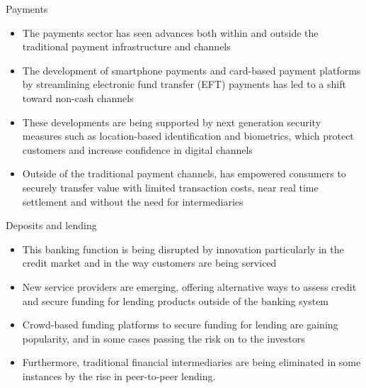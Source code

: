 \documentclass[10pt]{beamer}
\begin{document}
\begin{frame}{Payments}
	\begin{itemize}
		\item The payments sector has seen advances both within and outside the traditional payment infrastructure and channels
		\item The development of smartphone payments and card-based payment platforms by streamlining electronic fund transfer (EFT) payments has led to a shift toward non-cash channels
		\item These developments are being supported by next generation security measures such as location-based identification and biometrics, which protect customers and increase confidence in digital channels
		\item Outside of the traditional payment channels, has empowered consumers to securely transfer value with limited transaction costs, near real time settlement and without the need for intermediaries
	\end{itemize}
\end{frame}


\begin{frame}{Deposits and lending}
	\begin{itemize}
		\item This banking function is being disrupted by innovation particularly in the credit market and in the way customers are being serviced
		\item New service providers are emerging, offering alternative ways to assess credit and secure funding for lending products outside of the banking system
		\item Crowd-based funding platforms to secure funding for lending are gaining popularity, and in some cases passing the risk on to the investors
		\item Furthermore, traditional financial intermediaries are being eliminated in some instances by the rise in peer-to-peer lending.
	\end{itemize}
\end{frame}

\end{document}

